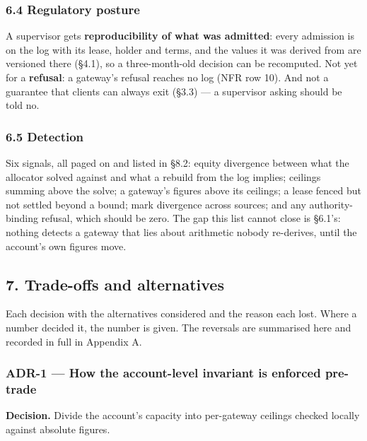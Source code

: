 \documentclass[10pt,a4paper]{article}
\begin{document}
\subsubsection{6.4 Regulatory posture}\label{regulatory-posture}

A supervisor gets \textbf{reproducibility of what was admitted}: every admission is on
the log with its lease, holder and terms, and the values it was derived from are
versioned there (§4.1), so a three-month-old decision can be recomputed. Not yet
for a \textbf{refusal}: a gateway's refusal reaches no log (NFR row 10). And not a
guarantee that clients can always exit (§3.3) --- a supervisor asking should be
told no.

\subsubsection{6.5 Detection}\label{detection}

Six signals, all paged on and listed in §8.2: equity divergence between what the
allocator solved against and what a rebuild from the log implies; ceilings
summing above the solve; a gateway's figures above its ceilings; a lease fenced
but not settled beyond a bound; mark divergence across sources; and any
authority-binding refusal, which should be zero. The gap this list cannot close
is §6.1's: nothing detects a gateway that lies about arithmetic nobody
re-derives, until the account's own figures move.



\label{start:8}%

\subsection{7. Trade-offs and alternatives}\label{trade-offs-and-alternatives}

Each decision with the alternatives considered and the reason each lost. Where a
number decided it, the number is given. The reversals are summarised here and
recorded in full in Appendix A.

\subsubsection{ADR-1 --- How the account-level invariant is enforced pre-trade}\label{adr-1-how-the-account-level-invariant-is-enforced-pre-trade}

\textbf{Decision.} Divide the account's capacity into per-gateway ceilings checked
locally against absolute figures.
\end{document}
